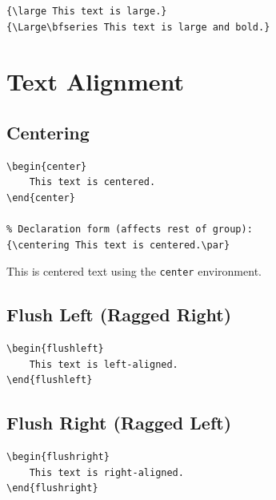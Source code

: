 \begin{lstlisting}[language={[LaTeX]TeX}, caption=Font size usage]
{\large This text is large.}
{\Large\bfseries This text is large and bold.}
\end{lstlisting}

\section{Text Alignment}

\subsection{Centering}

\begin{lstlisting}[language={[LaTeX]TeX}, caption=Centering text]
% Environment form:
\begin{center}
    This text is centered.
\end{center}

% Declaration form (affects rest of group):
{\centering This text is centered.\par}
\end{lstlisting}

\begin{center}
    This is centered text using the \texttt{center} environment.
\end{center}

\subsection{Flush Left (Ragged Right)}

\begin{lstlisting}[language={[LaTeX]TeX}, caption=Left-aligned text]
\begin{flushleft}
    This text is left-aligned.
\end{flushleft}
\end{lstlisting}

\subsection{Flush Right (Ragged Left)}

\begin{lstlisting}[language={[LaTeX]TeX}, caption=Right-aligned text]
\begin{flushright}
    This text is right-aligned.
\end{flushright}
\end{lstlisting}

